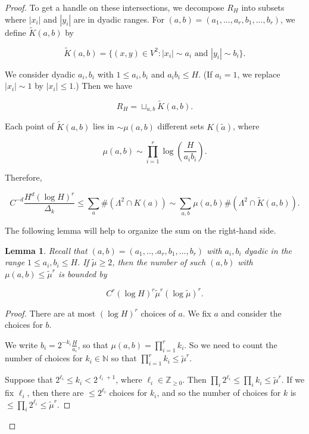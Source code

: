 \documentclass{amsart}
\newtheorem{lemma}[prop]{Lemma}
\newcommand{\ZZ}{\mathbb{Z}}
\newcommand{\NN}{\mathbb{N}}
\begin{document}
\begin{proof}
To get a handle on these intersections, we decompose $R_H$ into subsets where $|x_i|$ and $|y_i|$ are in dyadic ranges.  For $(a,b) = (a_1, ..., a_r, b_1, ..., b_r)$, we define $\tilde K(a,b)$ by

$$ \tilde K(a,b) = \{ (x,y) \in V^2: |x_i| \sim a_i \textrm{ and }  |y_i| \sim b_i \}. $$

\noindent We consider dyadic $a_i, b_i$ with $1 \le a_i, b_i$ and $a_i b_i \le H$.  (If $a_i = 1$, we replace $|x_i| \sim 1$ by $|x_i| \le 1$.)  Then we have

$$ R_H = \sqcup_{a,b} \tilde K(a,b). $$

Each point of $\tilde K(a,b)$ lies in  $\sim \mu(a,b)$ different sets $K(\tilde a)$, where

\begin{equation} \label{muform}
 \mu(a,b) \sim \prod_{i=1}^r \log \left( \frac{ H }{a_i b_i} \right). 
 \end{equation}
 
 Therefore,
 
 \begin{equation} \label{frame} C^{-d} \frac{ H^d (\log H)^r }{\Delta_k} \le \sum_a \# (\Lambda^2 \cap K(a)) \sim  \sum_{a,b} \mu(a,b) \# (\Lambda^2 \cap \tilde K(a,b) ). \end{equation} 
 
 The following lemma will help to organize the sum on the right-hand side.  
 
 \begin{lemma} Recall that $(a,b) = (a_1, ..,. a_r, b_1,..., b_r)$ with $a_i, b_i$ dyadic in the range $1 \le a_i, b_i \le H$.   If $\tilde \mu \ge 2$,  then the number of such $(a,b)$ with $\mu(a,b) \le \tilde \mu^r$ is bounded by
 
 $$C^r (\log H)^r \tilde \mu^r (\log \tilde \mu)^r . $$
 
  \end{lemma}

\begin{proof} There are at most $(\log H)^r$ choices of $a$.  We fix $a$ and consider the choices for $b$.

We write $b_i = 2^{-k_i} \frac{H}{a_i}$, so that $\mu(a,b) = \prod_{i=1}^r k_i$.  So we need to count the number of choices for $k_i \in \NN$ so that $\prod_{i=1}^r k_i \le \tilde \mu^r$.

Suppose that $2^{\ell_i} \le k_i  < 2^{\ell_i +1}$, where $\ell_i \in \ZZ_{\ge 0}$.   Then $\prod_i 2^{\ell_i} \le \prod_i k_i \le \tilde \mu^r$.   If we fix $\ell_i$, then there are $\le 2^{\ell_i}$ choices for $k_i$, and so the number of choices for $k$ is $\le \prod_i 2^{\ell_i} \le \tilde \mu^r$.


\end{proof}
\end{proof}
\end{document}
